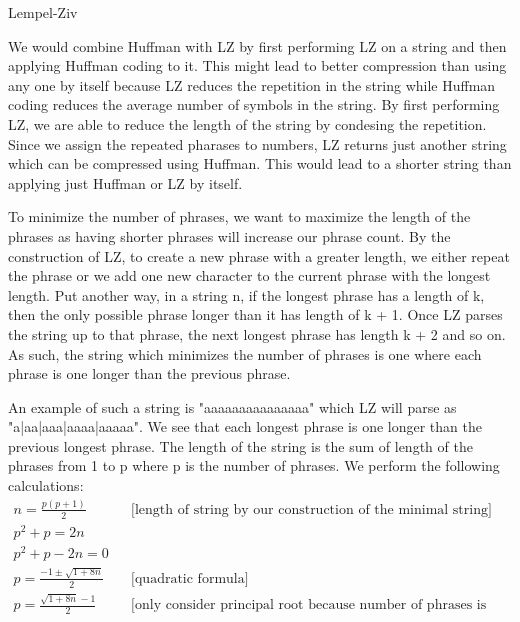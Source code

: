 \documentclass[11pt, nopagenumbers]{adamblan-hw}
\begin{document}
\begin{question}{\color{red} Lempel-Ziv}

\begin{part}
We would combine Huffman with LZ by first performing LZ on a string and then applying Huffman coding to it.
This might lead to better compression than using any one by itself because LZ reduces the repetition in the string
while Huffman coding reduces the average number of symbols in the string. By first performing LZ, we are able to reduce
the length of the string by condesing the repetition. Since we assign the repeated pharases to numbers, LZ returns just another 
string which can be compressed using Huffman. This would lead to a shorter string than applying just Huffman or LZ by itself.
\end{part}

\pagebreak
\begin{part}
To minimize the number of phrases, we want to maximize the length of the phrases as having
shorter phrases will increase our phrase count. By the construction of LZ, to create a new phrase
with a greater length, we either repeat the phrase or we add one new character to the current phrase with the longest length. Put another way,
in a string n, if the longest phrase has a length of k, then the only possible phrase longer than it has length
of k + 1. Once LZ parses the string up to that phrase, the next longest phrase has length k + 2 and so on. As such, 
the string which minimizes the number of phrases is one where each phrase is one longer than the previous phrase.

An example of such a string is "aaaaaaaaaaaaaaa" which LZ will parse as "a|aa|aaa|aaaa|aaaaa".
We see that each longest phrase is one longer than the previous longest phrase. The length of the string 
is the sum of length of the phrases from 1 to p where p is the number of phrases. We perform the following calculations:
\begin{align*}
n = \frac{p(p + 1)}{2} && \text{[length of string by our construction of the minimal string]} \\
p^2 + p = 2n \\
p^2 + p - 2n = 0 \\
p = \frac{-1 \pm \sqrt{1 + 8n}}{ 2} && \text{[quadratic formula]} \\
p = \frac{\sqrt{1 + 8n} - 1}{2} && \text{[only consider principal root because number of phrases is non-negative]} \\
\end{align*}


\end{part}
\end{question}
\end{document}
